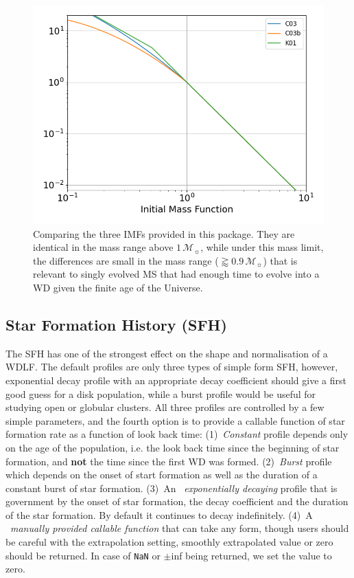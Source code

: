 \documentclass[fleqn,usenatbib]{rasti}
\newcommand{\msun}{\mathcal{M}_{\sun}}
\begin{document}
\begin{figure}
    \centering
    \includegraphics[width=\columnwidth]{imfs.png}
    \caption{Comparing the three IMFs provided in this package. They are
    identical in the mass range above $1\,\msun$, while under this mass
    limit, the differences are small in the mass range ($\gtrapprox0.9\,\msun$)
    that is relevant to singly evolved MS that had enough time to evolve into a
    WD given the finite age of the Universe.}
    \label{fig:imfs}
\end{figure}

\subsection{Star Formation History (SFH)}
The SFH has one of the strongest effect on the shape and normalisation of a
WDLF. The default profiles are only three types of simple form SFH, however,
exponential decay profile with an appropriate decay coefficient should give a
first good guess for a disk population, while a burst profile would be useful
for studying open or globular clusters. All three profiles are controlled by
a few simple parameters, and the fourth option is to provide a callable
function of star formation rate as a function of look back time:
(1)~\textit{Constant} profile depends only on the age of the population,
i.e. the look back time since the beginning of star formation,
and \textbf{not} the time since the first WD was formed. (2)~\textit{Burst}
profile which depends on the onset of start formation as well as the duration
of a constant burst of star formation. (3)~An ~\textit{exponentially decaying}
profile that is government by the onset of star formation, the decay coefficient
and the duration of the star formation. By default it continues to decay
indefinitely. (4)~A ~\textit{manually provided callable function} that can take
any form, though users should be careful with the extrapolation setting,
smoothly extrapolated value or zero should be returned. In case of \verb+NaN+
or $\pm$inf being returned, we set the value to zero.
\end{document}
